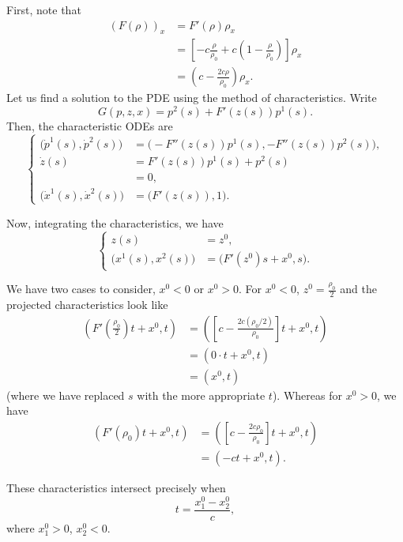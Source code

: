 \begin{solution*}
  First, note that
  \begin{align*}
    (F(\rho))_x
    &=F'(\rho)\rho_x\\
    &=\left[-c\frac{\rho}{\rho_0}+c\left(1-\frac{\rho}{\rho_0}\right)\right]\rho_x\\
    &=\left(c-\frac{2c\rho}{\rho_0}\right)\rho_x.
  \end{align*}
  Let us find a solution to the PDE using the method of
  characteristics. Write
  \[
    G(p,z,x)=p^2(s)+F'(z(s))p^1(s).
  \]
  Then, the characteristic ODEs are
  \[
    \left\{
      \begin{aligned}
        \bigl(\dot p^1(s),\dot p^2(s)\bigr)
        &=\bigl(-F''(z(s))p^1(s),-F''(z(s))p^2(s)\bigr),\\
        \dot z(s)
        &=F'(z(s))p^1(s)+p^2(s)\\
        &=0,\\
        \bigl(\dot x^1(s),\dot x^2(s)\bigr)
        &=\bigl(F'(z(s)),1\bigr).
      \end{aligned}
    \right.
  \]

  Now, integrating the characteristics, we have
  \[
    \left\{
      \begin{aligned}
         z(s)
        &=z^0,\\
        \bigl(x^1(s),x^2(s)\bigr)
        &=\bigl(F'(z^0)s+x^0,s\bigr).
      \end{aligned}
    \right.
  \]

  We have two cases to consider, \(x^0<0\) or \(x^0>0\). For \(x^0<0\),
  \(z^0=\frac{\rho_0}{2}\) and the projected characteristics look like
  \begin{align*}
    \left(
    F'(\tfrac{\rho_0}{2})t+x^0
    ,t\right)
    &=\left(
      \left[c-\tfrac{2c(\rho_0/2)}{\rho_0}\right]t+x^0,t
      \right)\\
    &=(0\cdot t+x^0,t)\\
    &=(x^0,t)
  \end{align*}
  (where we have replaced \(s\) with the more appropriate \(t\)). Whereas
  for \(x^0>0\), we have
  \begin{align*}
    \left(
    F'(\rho_0)t+x^0
    ,t\right)
    &=\left(
       \left[c-\tfrac{2c\rho_0}{\rho_0}\right]t+x^0,t
      \right)\\
    &=(-ct+x^0,t).
  \end{align*}

  These characteristics intersect precisely when
  \[
    t=\frac{x_1^0-x_2^0}{c},
  \]
  where \(x_1^0>0\), \(x_2^0<0\).
\end{solution*}

